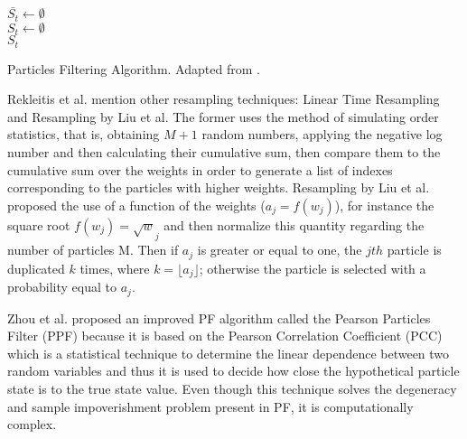 \IncMargin{1em}
\begin{algorithm}

\BlankLine
$\bar{S_t} \leftarrow \emptyset$\\
$S_t \leftarrow \emptyset$\\
  \Return $S_t$
\caption{Particles Filtering Algorithm. Adapted from \cite{Thrun:2005:PR:1121596}.}

\label{ch-2:algo:particles-filter}
\end{algorithm}\DecMargin{1em}

Rekleitis et al. mention other resampling techniques: Linear Time Resampling and Resampling by Liu et al. The former uses the method of simulating order statistics\cite{Gerontidis:stats}, that is, obtaining $M+1$ random numbers, applying the negative log number and then calculating their cumulative sum, then compare them to the cumulative sum over the weights in order to generate a list of indexes corresponding to the particles with higher weights\cite{Carpenter:improved-pf}. Resampling by Liu et al. proposed the use of a function of the weights ($a_j=f(w_j)$), for instance the square root $f(w_j) = \sqrt w_j$ and then normalize this quantity regarding the number of particles M. Then if $a_j$ is greater or equal to one, the $jth$ particle is duplicated $k$ times, where $k=\lfloor a_j \rfloor$; otherwise the particle is selected with a probability equal to $a_j$\cite{Liu:resampling}\cite{Rekleitis:particles-filter}.

Zhou et al. proposed an improved PF algorithm called the Pearson Particles Filter (PPF) because it is based on the Pearson Correlation Coefficient (PCC) which is a statistical technique to determine the linear dependence between two random variables and thus it is used to decide how close the hypothetical particle state is to the true state value. Even though this technique solves the degeneracy and sample impoverishment problem present in PF, it is computationally complex\cite{Zhou:sampling-method}. 


